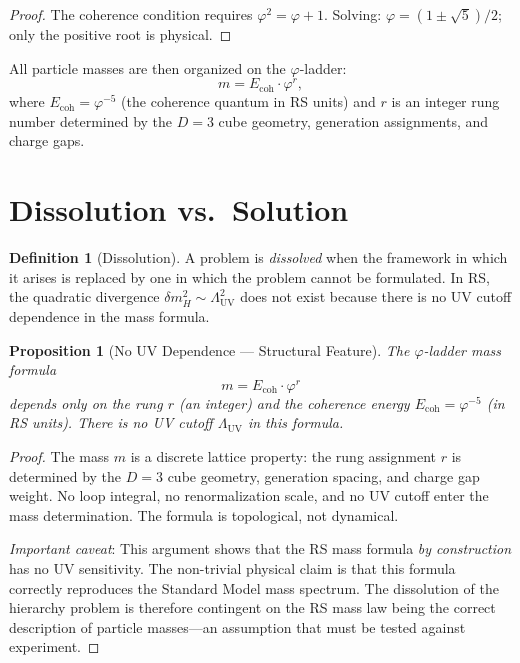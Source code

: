 \documentclass[12pt,a4paper]{article}
\newtheorem{proposition}[theorem]{Proposition}
\theoremstyle{definition}
\newtheorem{definition}[theorem]{Definition}
\theoremstyle{remark}
\begin{document}
\begin{proof}
The coherence condition requires $\varphi^2 = \varphi + 1$.
Solving: $\varphi = (1 \pm \sqrt{5})/2$; only the positive root is
physical.
\end{proof}

All particle masses are then organized on the $\varphi$-ladder:
\begin{equation}
  m = E_{\mathrm{coh}} \cdot \varphi^r,
\end{equation}
where $E_{\mathrm{coh}} = \varphi^{-5}$ (the coherence quantum in RS
units) and $r$ is an integer rung number determined by the $D = 3$
cube geometry, generation assignments, and charge gaps.

\section{Dissolution vs.\ Solution}
\label{sec:dissolve}

\begin{definition}[Dissolution]
A problem is \emph{dissolved} when the framework in which it
arises is replaced by one in which the problem cannot be
formulated.  In RS, the quadratic divergence
$\delta m_H^2 \sim \Lambda_{\mathrm{UV}}^2$ does not exist
because there is no UV cutoff dependence in the mass formula.
\end{definition}

\begin{proposition}[No UV Dependence --- Structural Feature]
\label{thm:no-uv}
The $\varphi$-ladder mass formula
\begin{equation}
  m = E_{\mathrm{coh}} \cdot \varphi^r
\end{equation}
depends only on the rung $r$ (an integer) and the coherence
energy $E_{\mathrm{coh}} = \varphi^{-5}$ (in RS units).  There
is no UV cutoff $\Lambda_{\mathrm{UV}}$ in this formula.
\end{proposition}

\begin{proof}
The mass $m$ is a discrete lattice property: the rung assignment
$r$ is determined by the $D = 3$ cube geometry, generation
spacing, and charge gap weight.  No loop integral, no
renormalization scale, and no UV cutoff enter the mass
determination.  The formula is topological, not dynamical.

\emph{Important caveat}: This argument shows that the RS mass formula
\emph{by construction} has no UV sensitivity.  The non-trivial physical
claim is that this formula correctly reproduces the Standard Model mass
spectrum.  The dissolution of the hierarchy problem is therefore
contingent on the RS mass law being the correct description of
particle masses---an assumption that must be tested against experiment.
\end{proof}
\end{document}
